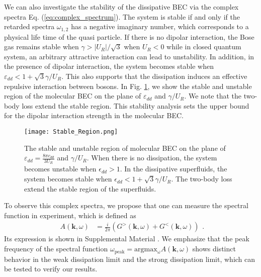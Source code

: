 \documentclass[aps,prl,twocolumn,superscriptaddress,]{revtex4-1}
\newcommand{\tmmathbf}[1]{\ensuremath{\boldsymbol{#1}}}
\newcommand{\tmop}[1]{\ensuremath{\operatorname{#1}}}
\begin{document}
We can also investigate the stability of the dissipative BEC via the complex spectra Eq. (\ref{eq:complex_spectrum}). The system is stable if and only if the retarded spectra $\omega_{1,2}$ has a negative imaginary number, which corresponds to a physical life time of the quasi particle. If there is no dipolar interaction, the Bose gas remains stable when $\gamma>|U_R|/\sqrt{3}$ when $U_R<0$ \cite{Ce2022} while in closed quantum system, an arbitrary attractive interaction can lead to unstability. In addition, in the presence of dipolar interaction, the system becomes stable when $\varepsilon_{dd}<1+\sqrt{3}\gamma/U_R$. This also supports that the dissipation induces an effective repulsive interaction between bosons. In Fig. \ref{fig:stable}, we show the stable and unstable region of the molecular BEC on the plane of $\varepsilon_{dd}$ and $\gamma/U_R$. We note that the two-body loss extend the stable region. This stability analysis sets the upper bound for the dipolar interaction strength in the molecular BEC. 
\begin{figure}
    \texttt{[image: Stable\_Region.png]}
    
    \caption{The stable and unstable region of molecular BEC on the plane of $\varepsilon_{dd}=\frac{8\pi c_{dd}}{3U_R}$ and $\gamma/U_R$. When there is no dissipation, the system becomes unstable when $\epsilon_{dd}>1$. In the dissipative superfluids, the system becomes stable when $\epsilon_{dd}<1+\sqrt{3}\gamma/U_R$. The two-body loss extend the stable region of the superfluids. }
    
       \label{fig:stable}
\end{figure}


To observe this complex spectra, we propose that one can measure the spectral function in experiment, which is defined as 
\begin{equation}
	\begin{aligned}A(\bm{k},\omega) & =\frac{i}{2\pi}(G^{>}(\bm{k},\omega)+G^{<}(\bm{k},\omega))\end{aligned}
	.\label{eq:spectrum_function}
\end{equation}
Its expression is shown in Supplemental Material \cite{SupplementaryMaterial}. We emphasize that the peak frequency of the spectral function $\omega_{\mathrm{peak}}=\mathrm{argmax_\omega}A(\bm{k},\omega)$ shows distinct behavior in the weak dissipation limit and the strong dissipation limit, which can be tested to verify our results.

\end{document}
